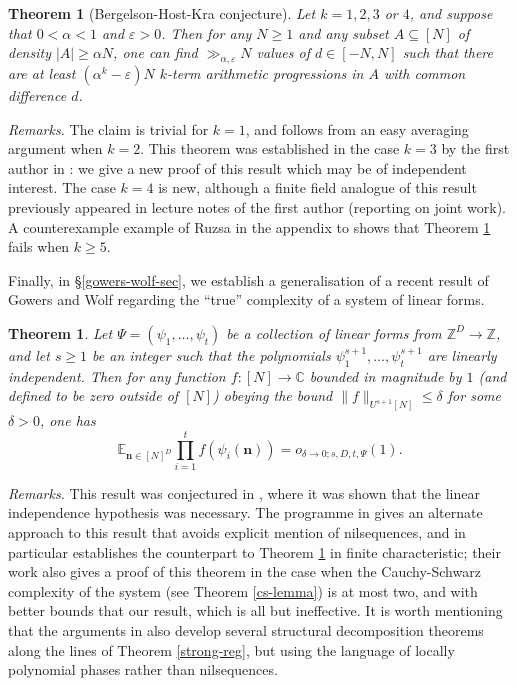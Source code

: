 \documentclass[11pt,reqno]{amsart}
\numberwithin{equation}{section}
\theoremstyle{plain}
\newtheorem{theorem}[subsection]{Theorem}
\theoremstyle{definition}
\renewcommand{\leq}{\leqslant}
\renewcommand{\geq}{\geqslant}
\newcommand\E{{\mathbb{E}}}
\newcommand\Z{\mathbb{Z}}
\newcommand\C{\mathbb{C}}
\newcommand\1{{\bf 1}}
\newcommand\2{{\bf 2}}
\newcommand\eps{\varepsilon}
\begin{document}
\begin{theorem}[Bergelson-Host-Kra conjecture]\label{bhk-thm}  Let $k = 1, 2, 3$ or $4$, and suppose that $0 < \alpha < 1$ and $\eps > 0$.  Then for any $N \geq 1$ and any subset $A \subseteq [N]$ of density $|A| \geq \alpha N$, one can find $\gg_{\alpha,\eps} N$ values of $d \in [-N,N]$ such that there are at least $(\alpha^k - \eps)N$ $k$-term arithmetic progressions in $A$ with common difference $d$.
\end{theorem}
\emph{Remarks.} The claim is trivial for $k=1$, and follows from an easy averaging argument when $k=2$.  This theorem was established in the case $k = 3$ by the first author in \cite{green-regularity}: we give a new proof of this result which may be of independent interest.  The case $k=4$ is new, although a finite field analogue of this result previously appeared in lecture notes of the first author \cite{green-montreal} (reporting on joint work).  A counterexample example of Ruzsa in the appendix to \cite{bergelson-host-kra} shows that Theorem \ref{bhk-thm} fails when $k \geq 5$.

Finally, in \S \ref{gowers-wolf-sec}, we establish a generalisation of a recent result of Gowers and Wolf \cite{gowers-wolf-1,gowers-wolf-2,gowers-wolf-3} regarding the ``true'' complexity of a system of linear forms.

\begin{theorem}\label{gwolf}  Let $\Psi = (\psi_1,\ldots,\psi_t)$ be a collection of linear forms from $\Z^D \to \Z$, and let $s \geq 1$ be an integer such that the polynomials $\psi_1^{s+1},\ldots,\psi_t^{s+1}$ are linearly independent.  Then for any function $f: [N] \to \C$ bounded in magnitude by $1$ \textup{(}and defined to be zero outside of $[N]$\textup{)} obeying the bound $\|f\|_{U^{s+1}[N]} \leq \delta$ for some $\delta > 0$, one has
$$ \E_{\mathbf{n} \in [N]^D} \prod_{i=1}^t f( \psi_i(\mathbf{n}) ) = o_{\delta \to 0; s, D,t,\Psi}(1).$$
\end{theorem}

\emph{Remarks.}  This result was conjectured in \cite{gowers-wolf-1}, where it was shown that the linear independence hypothesis was necessary.  The programme in \cite{gowers-wolf-1,gowers-wolf-2,gowers-wolf-3} gives an alternate approach to this result that avoids explicit mention of nilsequences, and in particular establishes the counterpart to Theorem \ref{gwolf} in finite characteristic; their work also gives a proof of this theorem in the case when the Cauchy-Schwarz complexity of the system (see Theorem \ref{cs-lemma}) is at most two, and with better bounds that our result, which is all but ineffective.  It is worth mentioning that the arguments in \cite{gowers-wolf-1,gowers-wolf-2,gowers-wolf-3} also develop several structural decomposition theorems along the lines of Theorem \ref{strong-reg}, but using the language of locally polynomial phases rather than nilsequences.  \vspace{11pt}
\end{document}
